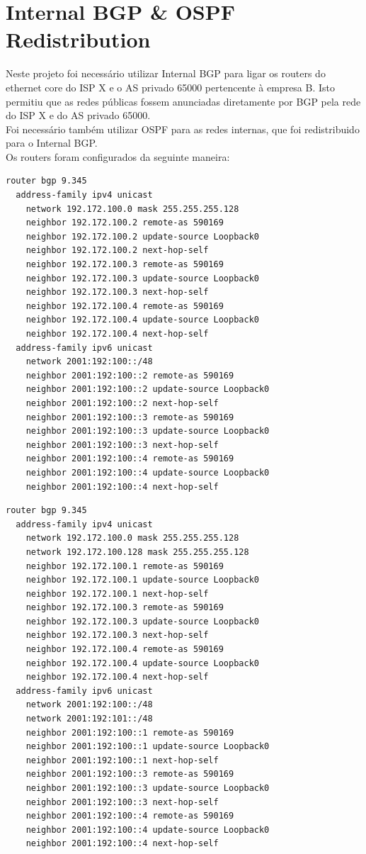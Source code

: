 \documentclass[11pt,a4paper]{report}
\begin{document}
\section{Internal BGP \& OSPF Redistribution}
Neste projeto foi necessário utilizar Internal BGP para ligar os routers do ethernet core do ISP X e o AS privado 65000 pertencente à empresa B. Isto permitiu que as redes públicas fossem anunciadas diretamente por BGP pela rede do ISP X e do AS privado 65000.\\
Foi necessário também utilizar OSPF para as redes internas, que foi redistribuido para o Internal BGP.\\
Os routers foram configurados da seguinte maneira:

\begin{lstlisting}[caption=Internal BGP - Router Porto]
router bgp 9.345
  address-family ipv4 unicast
  	network 192.172.100.0 mask 255.255.255.128
    neighbor 192.172.100.2 remote-as 590169
	neighbor 192.172.100.2 update-source Loopback0
 	neighbor 192.172.100.2 next-hop-self
 	neighbor 192.172.100.3 remote-as 590169
 	neighbor 192.172.100.3 update-source Loopback0
 	neighbor 192.172.100.3 next-hop-self
 	neighbor 192.172.100.4 remote-as 590169
 	neighbor 192.172.100.4 update-source Loopback0
  	neighbor 192.172.100.4 next-hop-self
  address-family ipv6 unicast
  	network 2001:192:100::/48
  	neighbor 2001:192:100::2 remote-as 590169
 	neighbor 2001:192:100::2 update-source Loopback0
 	neighbor 2001:192:100::2 next-hop-self
 	neighbor 2001:192:100::3 remote-as 590169
 	neighbor 2001:192:100::3 update-source Loopback0
 	neighbor 2001:192:100::3 next-hop-self
 	neighbor 2001:192:100::4 remote-as 590169
 	neighbor 2001:192:100::4 update-source Loopback0
 	neighbor 2001:192:100::4 next-hop-self
\end{lstlisting}

\begin{lstlisting}[caption=Internal BGP - Router Lisboa]
router bgp 9.345
  address-family ipv4 unicast
  	network 192.172.100.0 mask 255.255.255.128
  	network 192.172.100.128 mask 255.255.255.128
    neighbor 192.172.100.1 remote-as 590169
	neighbor 192.172.100.1 update-source Loopback0
 	neighbor 192.172.100.1 next-hop-self
 	neighbor 192.172.100.3 remote-as 590169
 	neighbor 192.172.100.3 update-source Loopback0
 	neighbor 192.172.100.3 next-hop-self
 	neighbor 192.172.100.4 remote-as 590169
 	neighbor 192.172.100.4 update-source Loopback0
  	neighbor 192.172.100.4 next-hop-self
  address-family ipv6 unicast
  	network 2001:192:100::/48
  	network 2001:192:101::/48
  	neighbor 2001:192:100::1 remote-as 590169
 	neighbor 2001:192:100::1 update-source Loopback0
 	neighbor 2001:192:100::1 next-hop-self
 	neighbor 2001:192:100::3 remote-as 590169
 	neighbor 2001:192:100::3 update-source Loopback0
 	neighbor 2001:192:100::3 next-hop-self
 	neighbor 2001:192:100::4 remote-as 590169
 	neighbor 2001:192:100::4 update-source Loopback0
 	neighbor 2001:192:100::4 next-hop-self
\end{lstlisting}
\end{document}
